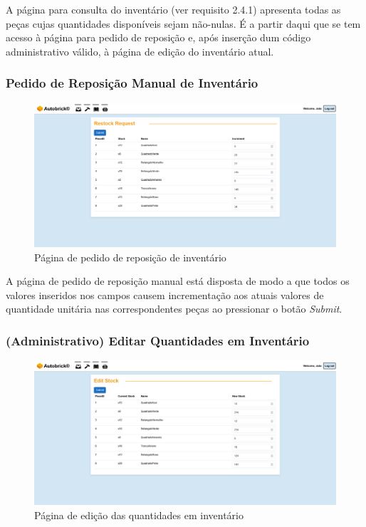                     A página para consulta do inventário (ver requisito 2.4.1) apresenta todas as peças cujas quantidades disponíveis sejam não-nulas. É a partir daqui que se tem acesso à página para pedido de reposição e, após inserção dum código administrativo válido, à página de edição do inventário atual.
                
                \subsubsection{Pedido de Reposição Manual de Inventário} %

                    \begin{figure}[h!]
                        \centering
                        \includegraphics[width=0.8\linewidth, frame]{images/Site/Restock.pdf}
                        \caption{Página de pedido de reposição de inventário}
                        \label{fig:Página de pedido de reposição de inventário}
                    \end{figure}

                    A página de pedido de reposição manual está disposta de modo a que todos os valores inseridos nos campos causem incrementação aos atuais valores de quantidade unitária nas correspondentes peças ao pressionar o botão \textit{Submit}.
                
                \subsubsection{(Administrativo) Editar Quantidades em Inventário} %

                    \begin{figure}[h!]
                        \centering
                        \includegraphics[width=0.8\linewidth, frame]{images/Site/EditStock.pdf}
                        \caption{Página de edição das quantidades em inventário}
                        \label{fig:Página de edição das quantidades em inventário}
                    \end{figure}    

